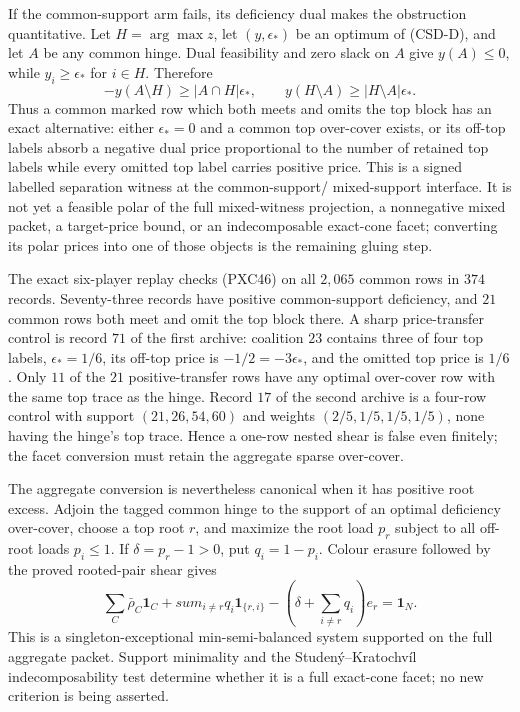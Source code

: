\documentclass[11pt]{article}
\newcommand{\one}{\mathbf 1}
\begin{document}
If the common-support arm fails, its deficiency dual makes the obstruction
quantitative.  Let $H=\arg\max z$, let $(y,\epsilon_*)$ be an optimum of
(CSD-D), and let $A$ be any common hinge.  Dual feasibility and zero slack
on $A$ give $y(A)\le0$, while $y_i\ge\epsilon_*$ for $i\in H$.  Therefore
\[
 -y(A\setminus H)\ge |A\cap H|\epsilon_* ,
 \qquad
 y(H\setminus A)\ge |H\setminus A|\epsilon_* .       \tag{PXC46}
\]
Thus a common marked row which both meets and omits the top block has an
exact alternative: either $\epsilon_*=0$ and a common top over-cover exists,
or its off-top labels absorb a negative dual price proportional to the number
of retained top labels while every omitted top label carries positive price.
This is a signed labelled separation witness at the common-support/
mixed-support interface.  It is not yet a feasible polar of the full
mixed-witness projection, a nonnegative mixed packet, a target-price bound,
or an indecomposable exact-cone facet; converting its polar prices into one
of those objects is the remaining gluing step.

The exact six-player replay checks (PXC46) on all $2{,}065$ common rows in
$374$ records.  Seventy-three records have positive common-support
deficiency, and $21$ common rows both meet and omit the top block there.  A
sharp price-transfer control is record $71$ of the first archive: coalition
$23$ contains three of four top labels, $\epsilon_*=1/6$, its off-top price is
$-1/2=-3\epsilon_*$, and the omitted top price is $1/6$.
Only $11$ of the $21$ positive-transfer rows have any optimal over-cover row
with the same top trace as the hinge.  Record $17$ of the second archive is a
four-row control with support $(21,26,54,60)$ and weights
$(2/5,1/5,1/5,1/5)$, none having the hinge's top trace.  Hence a one-row
nested shear is false even finitely; the facet conversion must retain the
aggregate sparse over-cover.

The aggregate conversion is nevertheless canonical when it has positive
root excess.  Adjoin the tagged common hinge to the support of an optimal
deficiency over-cover, choose a top root $r$, and maximize the root load
$p_r$ subject to all off-root loads $p_i\le1$.  If
$\delta=p_r-1>0$, put $q_i=1-p_i$.  Colour erasure followed by the proved
rooted-pair shear gives
\[
 \sum_C\bar\rho_C\one_C+sum_{i\ne r}q_i\one_{\{r,i\}}
 -\left(\delta+\sum_{i\ne r}q_i\right)e_r=\one_N .  \tag{PXC47}
\]
This is a singleton-exceptional min-semi-balanced system supported on the
full aggregate packet.  Support minimality and the Studen\'y--Kratochv\'il
indecomposability test determine whether it is a full exact-cone facet; no
new criterion is being asserted.
\end{document}
